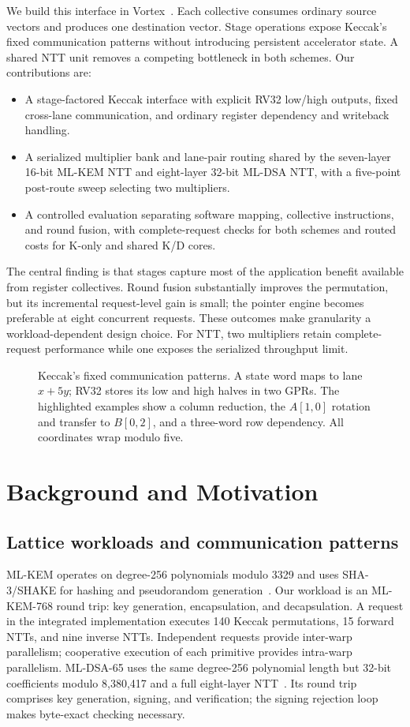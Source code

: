 \documentclass[conference,letterpaper]{IEEEtran}
\begin{document}
We build this interface in Vortex~\cite{vortex}. Each collective consumes
ordinary source vectors and produces one destination vector. Stage
operations expose Keccak's fixed communication patterns without introducing
persistent accelerator state. A shared NTT unit removes a competing
bottleneck in both schemes. Our contributions are:
\begin{itemize}
\item A stage-factored Keccak interface with explicit RV32 low/high outputs,
fixed cross-lane communication, and ordinary register dependency and
writeback handling.
\item A serialized multiplier bank and lane-pair routing shared by the
seven-layer 16-bit ML-KEM NTT and eight-layer 32-bit ML-DSA NTT, with a
five-point post-route sweep selecting two multipliers.
\item A controlled evaluation separating software mapping, collective
instructions, and round fusion, with complete-request checks for both
schemes and routed costs for K-only and shared K/D cores.
\end{itemize}
The central finding is that stages capture most of the application benefit
available from register collectives. Round fusion substantially improves
the permutation, but its incremental request-level gain is small; the
pointer engine becomes preferable at eight concurrent requests. These
outcomes make granularity a workload-dependent design choice. For NTT,
two multipliers retain complete-request performance while one exposes the
serialized throughput limit.

\begin{figure}[t]
\centering
\caption{Keccak's fixed communication patterns. A state word maps to lane
$x+5y$; RV32 stores its low and high halves in two GPRs. The highlighted
examples show a column reduction, the $A[1,0]$ rotation and transfer to
$B[0,2]$, and a three-word row dependency. All coordinates wrap modulo five.}
\label{fig:keccak}
\end{figure}

\section{Background and Motivation}
\subsection{Lattice workloads and communication patterns}
ML-KEM operates on degree-256 polynomials modulo 3329 and uses SHA-3/SHAKE
for hashing and pseudorandom generation~\cite{fips203,fips202}.
Our workload is an ML-KEM-768 round trip: key generation, encapsulation,
and decapsulation. A request in the integrated implementation executes
140 Keccak permutations, 15 forward NTTs, and nine inverse NTTs. Independent
requests provide inter-warp parallelism; cooperative execution of each
primitive provides intra-warp parallelism.
ML-DSA-65 uses the same degree-256 polynomial length but 32-bit
coefficients modulo 8,380,417 and a full eight-layer NTT~\cite{fips204}.
Its round trip comprises key generation, signing, and verification; the
signing rejection loop makes byte-exact checking necessary.
\end{document}
